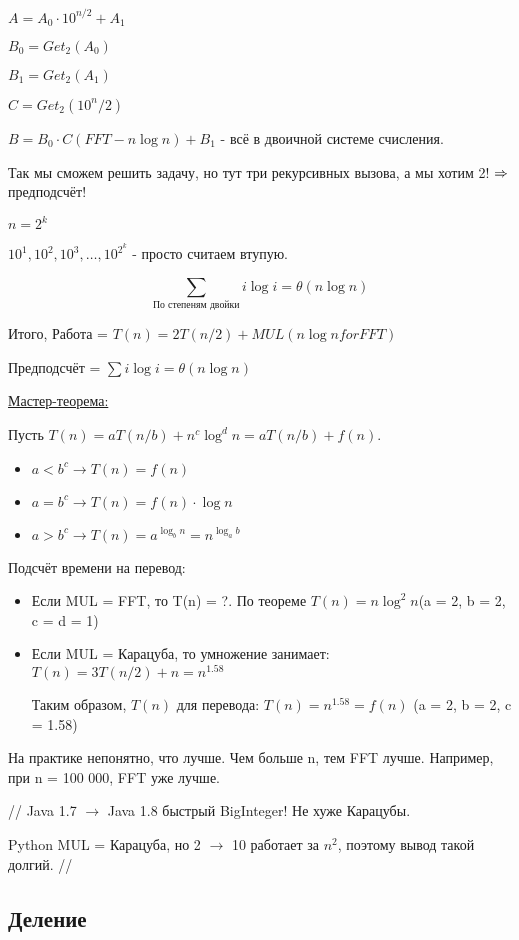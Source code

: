 $A = A_0 \cdot 10^{n/2} + A_1$

$B_0 = Get_2(A_0)$

$B_1 = Get_2(A_1)$

$C = Get_2(10^n/2)$

$B = B_0 \cdot C (FFT - n \log n) + B_1$ - всё в двоичной системе счисления.

Так мы сможем решить задачу, но тут три рекурсивных вызова, а мы хотим 2! $\Rightarrow$ предподсчёт!

$n = 2^k$

$10^1, 10^2, 10^3, \dots, 10^{2^k}$ - просто считаем втупую.

\[ \sum\limits_{\text{По степеням двойки}} i \log i = \theta (n \log n) \]

Итого, Работа = $T(n) = 2T(n/2) + MUL(n \log n for FFT)$

Предподсчёт = $\sum i \log i = \theta(n \log n)$

\underline{Мастер-теорема:}

Пусть $T(n) = aT(n/b) + n^c\log^d n = aT(n/b) + f(n)$.
\begin{itemize}
	\item $a < b^c \rightarrow T(n) = f(n)$
	\item $a = b^c \rightarrow T(n) = f(n)\cdot\log n$
	\item $a > b^c \rightarrow T(n) = a^{\log_b n} = n^{\log_a b}$
\end{itemize}

Подсчёт времени на перевод:
\begin{itemize}
	\item Если MUL = FFT, то T(n) = ?. По теореме $T(n) = n\log^2 n$(a = 2, b = 2, c = d = 1)
	\item Если MUL = Карацуба, то умножение занимает: $T(n) = 3T(n/2) + n = n^{1.58}$
	
	Таким образом, $T(n)$ для перевода: $T(n) = n^{1.58} = f(n)$ (a = 2, b = 2, c = 1.58)	
\end{itemize}

На практике непонятно, что лучше. Чем больше n, тем FFT лучше. Например, при n = 100 000, FFT уже лучше.

// Java 1.7 $\rightarrow$ Java 1.8 быстрый BigInteger! Не хуже Карацубы.

Python MUL = Карацуба, но 2 $\rightarrow$ 10 работает за $n^2$, поэтому вывод такой долгий. //

\subsection{Деление}

